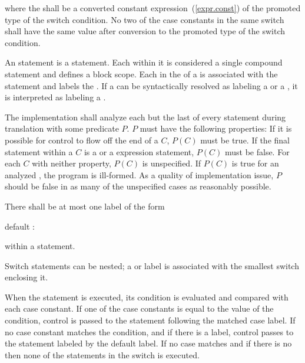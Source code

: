 \documentclass[ebook,10pt,oneside,openany,final]{memoir}
\begin{document}
where the  shall be
a converted constant expression~(\ref{expr.const}) of the
promoted type of the switch condition. No two of the case constants in
the same switch shall have the same value after conversion to the
promoted type of the switch condition.

\begin{shaded}

\pnum
An  statement is a  statement.  Each  within it is considered a single compound statement and defines a block scope.  Each  in the  of a  is associated with the  statement and labels the .  If a  can be syntactically resolved as labeling a  or a , it is interpreted as labeling a .

\pnum
The implementation shall analyze each but the last  of every  statement during translation with some predicate $P$.  $P$ must have the following properties:  If it is possible for control to flow off the end of a  $C$, $P(C)$ must be true.  If the final statement within a  $C$ is a  or a  expression statement, $P(C)$ must be false.  For each  $C$ with neither property, $P(C)$ is unspecified.  If $P(C)$ is true for an analyzed , the program is ill-formed.  \enternote As a quality of implementation issue, $P$ should be false in as many of the unspecified cases as reasonably possible. \exitnote

\end{shaded}

\pnum
{}%
There shall be at most one label of the form

\begin{codeblock}
default :
\end{codeblock}

within a  statement.

\pnum
Switch statements can be nested; a  or  label
is associated with the smallest switch enclosing it.

\pnum
When the  statement is executed, its condition is
evaluated and compared with each case constant.
%
If one of the case constants is equal to the value of the condition,
control is passed to the statement following the matched case label. If
no case constant matches the condition, and if there is a
%
 label, control passes to the statement labeled by the
default label. If no case matches and if there is no 
then none of the statements in the switch is executed.
\end{document}
